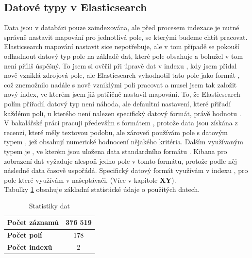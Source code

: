 \documentclass[czech,BP]{thesiskiv}
\begin{document}
\subsection{Datové typy v Elasticsearch}
Data jsou v databázi pouze zaindexována, ale před procesem indexace je nutné správně nastavit mapování pro jednotlivá pole, se kterými budeme chtít pracovat. Elasticsearch mapování nastavit sice nepotřebuje, ale v tom případě se pokouší odhadnout datový typ pole na základě dat, které pole obsahuje a bohužel v tom není příliš úspěšný. To jsem si ověřil při úpravě dat v indexu , kdy jsem přidal nově vzniklá zdrojová pole, ale Elasticsearch vyhodnotil tato pole jako formát , což znemožnilo nadále s nově vzniklými poli pracovat a musel jsem tak založit nový index, ve kterém jsem již patřičně nastavil mapování. To, že Elasticsearch polím přiřadil datový typ  není náhoda, ale defaultní nastavení, které přiřadí každému poli, u kterého není nalezen specifický datový formát, právě hodnotu .
\\
V bakalářské práci pracuji především s formátem , protože data jsou získána z recenzí, které měly textovou podobu, ale zároveň používám pole s datovým typem , jež obsahují numerické hodnocení nějakého kritéria. Dalším využívaným typem je , ve kterém jsou uložena data standardního formátu . Kibana pro zobrazení dat vyžaduje alespoň jedno pole v tomto formátu, protože podle něj následně data časově uspořádá. Specifický datový formát  využívám v indexu , pro pole které využívám v našeptávači. (Více v kapitole \textbf{XY}).
\\
Tabulky \ref{statistiky} obsahuje základní statistické údaje o použitých datech.

\begin{table}[h]
\centering
\begin{tabular}{|l|c|}
	\hline
	\textbf{Počet záznamů} & 376 519 \\ \hline
	\textbf{Počet polí}    & 178     \\ \hline
	\textbf{Počet indexů}  & 2       \\ \hline
\end{tabular}
\caption{Statistiky dat}
\label{statistiky}
\end{table}
\end{document}
